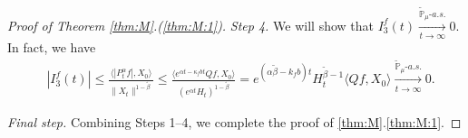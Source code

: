 \documentclass[12pt,a4paper]{amsart}
\theoremstyle{plain}
\theoremstyle{definition}
\numberwithin{equation}{section}
\begin{document}
\begin{proof}[Proof of Theorem \ref{thm:M}.(\ref{thm:M:1})]
	\emph{Step 4.} We will show that $I^f_3(t) \xrightarrow[t\to \infty]{\widetilde {\mathbb P}_\mu \text{-} a.s.} 0$.
  In fact, we have
  \begin{align}
    & |I^f_3(t)|
      \leq \frac{\langle |P^\alpha_tf|,X_0\rangle}{\|X_t\|^{1 - \tilde \beta }}
      \leq \frac{\langle e^{\alpha t - \kappa_f b t}Qf,X_0\rangle}{(e^{\alpha t} H_t)^{1 - \tilde \beta}}
      = e^{(\alpha \tilde \beta - k_fb)t} H_t^{\tilde \beta - 1} \langle Qf,X_0\rangle
      \xrightarrow[t\to \infty]{\widetilde {\mathbb P}_\mu \text{-} a.s.} 0.
  \end{align}

  \emph{Final step.} Combining Steps 1--4, we complete the proof of \ref{thm:M}.\eqref{thm:M:1}.
\end{proof}

\end{document}
